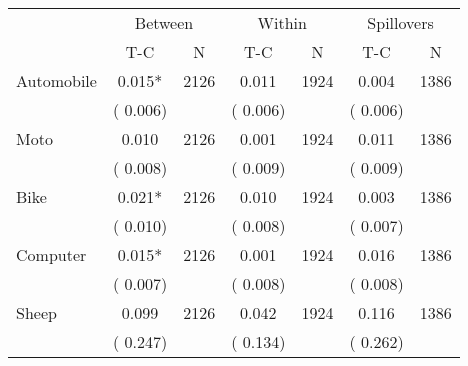 
\begin{tabular}{l*{6}{c}}\hline&\multicolumn{2}{c}{Between}&\multicolumn{2}{c}{Within}&\multicolumn{2}{c}{Spillovers} \\ \cmidrule(r){2-3}\cmidrule(l){4-5}\cmidrule(l){6-7} & {T-C} & {N} & {T-C} & {N}  & {T-C}  & {N}  \\ \midrule
Automobile        &              0.015*      &       2126       &              0.011      &       1924       &              0.004      &       1386       \\
                       &       (       0.006)            &                               &       (       0.006)            &                               &       (       0.006)            &                               \\
Moto        &              0.010      &       2126       &              0.001      &       1924       &              0.011      &       1386       \\
                       &       (       0.008)            &                               &       (       0.009)            &                               &       (       0.009)            &                               \\
Bike        &              0.021*      &       2126       &              0.010      &       1924       &              0.003      &       1386       \\
                       &       (       0.010)            &                               &       (       0.008)            &                               &       (       0.007)            &                               \\
Computer        &              0.015*      &       2126       &              0.001      &       1924       &              0.016      &       1386       \\
                       &       (       0.007)            &                               &       (       0.008)            &                               &       (       0.008)            &                               \\
Sheep        &              0.099      &       2126       &              0.042      &       1924       &              0.116      &       1386       \\
                       &       (       0.247)            &                               &       (       0.134)            &                               &       (       0.262)            &                               \\

\end{tabular}

